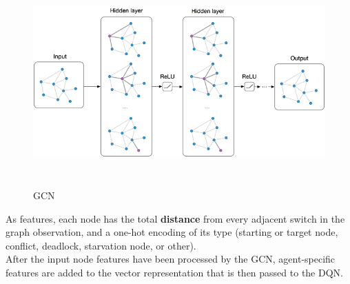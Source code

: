 \begin{figure}[H] 
	\includegraphics[height=80mm, width=140mm, scale=0.5]{chapters/gcn.png}
	\centering
	\caption{GCN}
	\label{fig:s5} 
\end{figure}
\noindent
As features, each node has the total \textbf{distance} from every adjacent switch in the graph observation, and a one-hot encoding of its type (starting or target node, conflict, deadlock, starvation node, or other). \\
After the input node features have been processed by the GCN, agent-specific features are added to the vector representation that is then passed to the DQN.
